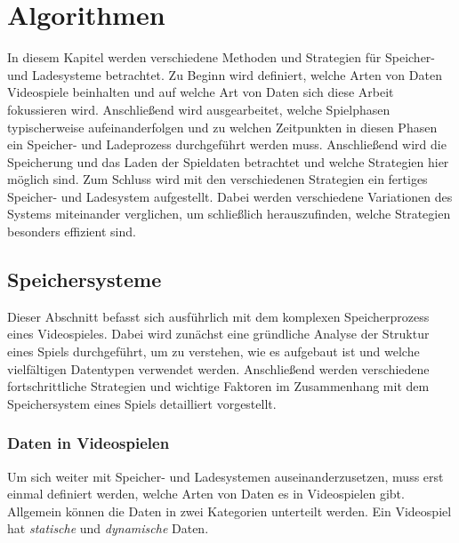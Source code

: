 \chapter{Algorithmen}\label{ch:algorithmen}
In diesem Kapitel werden verschiedene Methoden und Strategien für Speicher- und Ladesysteme betrachtet. Zu Beginn wird definiert, welche Arten von Daten Videospiele beinhalten und auf welche Art von Daten sich diese Arbeit fokussieren wird. Anschließend wird ausgearbeitet, welche Spielphasen typischerweise aufeinanderfolgen und zu welchen Zeitpunkten in diesen Phasen ein Speicher- und Ladeprozess durchgeführt werden muss. Anschließend wird die Speicherung und das Laden der Spieldaten betrachtet und welche Strategien hier möglich sind. Zum Schluss wird mit den verschiedenen Strategien ein fertiges Speicher- und Ladesystem aufgestellt. Dabei werden verschiedene Variationen des Systems miteinander verglichen, um schließlich herauszufinden, welche Strategien besonders effizient sind.




\section{Speichersysteme}\label{sect:speichersysteme}
Dieser Abschnitt befasst sich ausführlich mit dem komplexen Speicherprozess eines Videospieles. Dabei wird zunächst eine gründliche Analyse der Struktur eines Spiels durchgeführt, um zu verstehen, wie es aufgebaut ist und welche vielfältigen Datentypen verwendet werden. Anschließend werden verschiedene fortschrittliche Strategien und wichtige Faktoren im Zusammenhang mit dem Speichersystem eines Spiels detailliert vorgestellt.


\subsection{Daten in Videospielen}
Um sich weiter mit Speicher- und Ladesystemen auseinanderzusetzen, muss erst einmal definiert werden, welche Arten von Daten es in Videospielen gibt. Allgemein können die Daten in zwei Kategorien unterteilt werden. Ein Videospiel hat \textit{statische} und \textit{dynamische} Daten.

